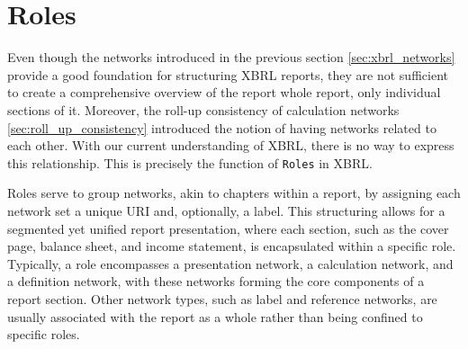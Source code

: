 \label{sec:roles}
\section{Roles}

Even though the networks introduced in the previous section \ref{sec:xbrl_networks} provide a good foundation for structuring XBRL reports, 
they are not sufficient to create a comprehensive overview of the report whole report, only individual sections of it.
Moreover, the roll-up consistency of calculation networks \ref{sec:roll_up_consistency} introduced the notion of having networks related to each other.
With our current understanding of XBRL, there is no way to express this relationship.
This is precisely the function of \texttt{Roles} in XBRL.






Roles serve to group networks, akin to chapters within a report, by assigning each network set a unique URI and, optionally, a label. 
This structuring allows for a segmented yet unified report presentation, where each section, such as the cover page, balance sheet, 
and income statement, is encapsulated within a specific role. 
Typically, a role encompasses a presentation network, a calculation network, and a definition network, 
with these networks forming the core components of a report section. 
Other network types, such as label and reference networks, are usually associated with the report as a whole rather than being confined to specific roles.

